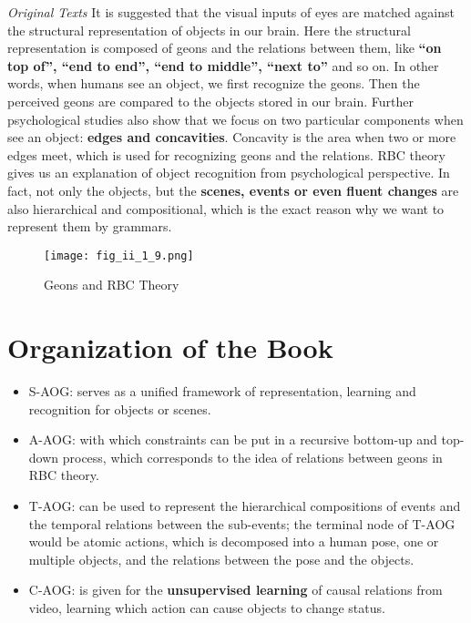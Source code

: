 \documentclass[../Notes_of_CaRiVaC.tex]{subfiles}
\begin{document}
\begin{textbox}{\textit{Original Texts}}
It is suggested that the visual inputs of eyes are matched against the
structural representation of objects in our brain. Here the structural
representation is composed of geons and the relations between them, like
\textbf{``on top of'', ``end to end'', ``end to middle'', ``next to''} and so
on. In other words, when humans see an object, we first recognize the geons.
Then the perceived geons are compared to the objects stored in our brain.
Further psychological studies also show that we focus on two particular
components when see an object: \textbf{edges and concavities}. Concavity is the
area when two or more edges meet, which is used for recognizing geons and the
relations. RBC theory gives us an explanation of object recognition from
psychological perspective. In fact, not only the objects, but the
\textbf{scenes, events or even fluent changes} are also hierarchical and
compositional, which is the exact reason why we want to represent them by
grammars.
\end{textbox}
%
\begin{figure}[!htpb]
  \centering
  \texttt{[image: fig\_ii\_1\_9.png]}
  \caption{Geons and RBC Theory}%
  \label{fig:ii.1.9}
\end{figure}
%

\section{Organization of the Book}%
\label{sec:ii.1.7}
\begin{itemize}
  \item S-AOG\@: serves as a unified framework of representation, learning and
    recognition for objects or scenes.
  \item A-AOG\@: with which constraints can be put in a recursive bottom-up
    and top-down process, which corresponds to the idea of relations between
    geons in RBC theory.
  \item T-AOG\@: can be used to represent the hierarchical compositions of
    events and the temporal relations between the sub-events; the terminal node
    of T-AOG would be atomic actions, which is decomposed into a human pose,
    one or multiple objects, and the relations between the pose and the objects.
  \item C-AOG\@: is given for the \textbf{unsupervised learning} of causal
    relations from video, learning which action can cause objects to change
    status.
\end{itemize}
\end{document}
